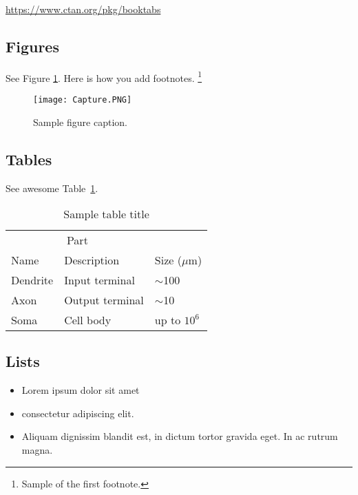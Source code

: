 \documentclass[12pt]{article}
\begin{document}
\begin{center}
  \url{https://www.ctan.org/pkg/booktabs}
\end{center}


\subsection{Figures}
\lipsum[10] 
See Figure \ref{fig:fig1}. Here is how you add footnotes. \footnote{Sample of the first footnote.}
\lipsum[11] 

\begin{figure}[!htb]
  \centering
  \texttt{[image: Capture.PNG]}
  \caption{Sample figure caption.}
  \label{fig:fig1}
\end{figure}

\subsection{Tables}
\lipsum[12]
See awesome Table~\ref{tab:table}.

\begin{table}
 \caption{Sample table title}
  \centering
  \begin{tabular}{lll}
    \toprule
    \multicolumn{2}{c}{Part}                   \\
    \cmidrule(r){1-2}
    Name     & Description     & Size ($\mu$m) \\
    \midrule
    Dendrite & Input terminal  & $\sim$100     \\
    Axon     & Output terminal & $\sim$10      \\
    Soma     & Cell body       & up to $10^6$  \\
    \bottomrule
  \end{tabular}
  \label{tab:table}
\end{table}

\subsection{Lists}
\begin{itemize}
\item Lorem ipsum dolor sit amet
\item consectetur adipiscing elit. 
\item Aliquam dignissim blandit est, in dictum tortor gravida eget. In ac rutrum magna.
\end{itemize}


  
\end{document}
